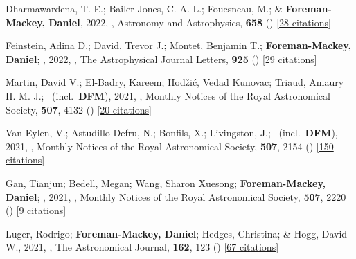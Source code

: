 \item[{\color{numcolor}\scriptsize76}] Dharmawardena, T. E.; Bailer-Jones, C. A. L.; Fouesneau, M.; \& \textbf{Foreman-Mackey, Daniel}, 2022, , Astronomy and Astrophysics, \textbf{658} () [\href{https://ui.adsabs.harvard.edu/abs/2022A&A...658A.166D}{28 citations}]

\item[{\color{numcolor}\scriptsize75}] Feinstein, Adina D.; David, Trevor J.; Montet, Benjamin T.; \textbf{Foreman-Mackey, Daniel}; \etal, 2022, , The Astrophysical Journal Letters, \textbf{925} () [\href{https://ui.adsabs.harvard.edu/abs/2022ApJ...925L...2F}{29 citations}]

\item[{\color{numcolor}\scriptsize74}] Martin, David V.; El-Badry, Kareem; Hod{\v{z}}i{\'c}, Vedad Kunovac; Triaud, Amaury H. M. J.; \etal\ (incl.\ \textbf{DFM}), 2021, , Monthly Notices of the Royal Astronomical Society, \textbf{507}, 4132 () [\href{https://ui.adsabs.harvard.edu/abs/2021MNRAS.507.4132M}{20 citations}]

\item[{\color{numcolor}\scriptsize73}] Van Eylen, V.; Astudillo-Defru, N.; Bonfils, X.; Livingston, J.; \etal\ (incl.\ \textbf{DFM}), 2021, , Monthly Notices of the Royal Astronomical Society, \textbf{507}, 2154 () [\href{https://ui.adsabs.harvard.edu/abs/2021MNRAS.507.2154V}{150 citations}]

\item[{\color{numcolor}\scriptsize72}] Gan, Tianjun; Bedell, Megan; Wang, Sharon Xuesong; \textbf{Foreman-Mackey, Daniel}; \etal, 2021, , Monthly Notices of the Royal Astronomical Society, \textbf{507}, 2220 () [\href{https://ui.adsabs.harvard.edu/abs/2021MNRAS.507.2220G}{9 citations}]

\item[{\color{numcolor}\scriptsize71}] Luger, Rodrigo; \textbf{Foreman-Mackey, Daniel}; Hedges, Christina; \& Hogg, David W., 2021, , The Astronomical Journal, \textbf{162}, 123 () [\href{https://ui.adsabs.harvard.edu/abs/2021AJ....162..123L}{67 citations}]


